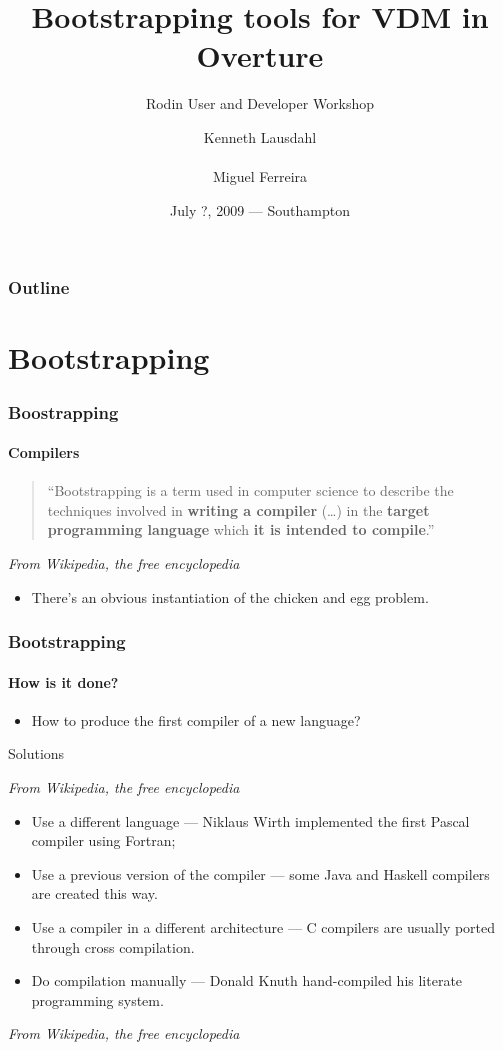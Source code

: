 \documentclass[slidestop,uncompress,mathserif,notes]{beamer}
\title[Bootstrapping in Overture]{Bootstrapping tools for VDM in Overture}
\subtitle{Rodin User and Developer Workshop}
\author[K. Lausdahl, M. Ferreira]{
  Kenneth Lausdahl \\
  \mail{kennethemail AT email.com} \\
  Miguel Ferreira \\
  \mail{m.ferreira AT sig.nl}
}
\institute[IHA, SIG]{
  Aarhus School of Engineering\\
  Software Improvement Group
}
\date{July ?, 2009 --- Southampton}
\newcommand{\from}[1]{%
\noindent%
\begin{flushright}%
    \emph{\footnotesize #1}%
\end{flushright}%
}
\begin{document}
 

\begin{frame}
	\titlepage
\end{frame}

\begin{frame}
  \frametitle{Outline}
  \tableofcontents %
\end{frame}


\section{Bootstrapping}
\label{sec:bootstrapping}

\begin{frame}
  \frametitle{Boostrapping}
  \framesubtitle{Compilers}


  \begin{quotation}
	``Bootstrapping is a term used in computer science to describe the techniques involved in \textbf{writing a compiler} (\dots) in the \textbf{target programming language} which \textbf{it is intended to compile}.''
  \end{quotation}
  \from{From Wikipedia, the free encyclopedia}

  \pause
  \begin{itemize}
	\item There's an obvious instantiation of the \alert{chicken and egg} problem.
  \end{itemize}
\end{frame}

\begin{frame}
  \frametitle{Bootstrapping}
  \framesubtitle{How is it done?}

  \pause
  \begin{itemize}
	\item How to produce the first compiler of a \alert{new} language?
  \end{itemize}

  \pause
  \begin{block}{Solutions \from{From Wikipedia, the free encyclopedia}}
  \begin{itemize}
	  \pause
	\item Use a different language  --- Niklaus Wirth implemented the first Pascal compiler using Fortran;
	  \pause
	\item Use a previous version of the compiler --- some Java and Haskell compilers are created this way.
	  \pause
	\item Use a compiler in a different architecture --- C compilers are usually ported through cross compilation.
	  \pause
	\item Do compilation manually --- Donald Knuth hand-compiled his literate programming system.
  \end{itemize}
  \end{block}
  \from{From Wikipedia, the free encyclopedia}
\end{frame}
\end{document}
